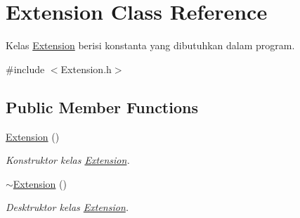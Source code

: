 \hypertarget{class_extension}{}\section{Extension Class Reference}
\label{class_extension}


Kelas \hyperlink{class_extension}{Extension} berisi konstanta yang dibutuhkan dalam program.  




{\ttfamily \#include $<$Extension.\+h$>$}

\subsection*{Public Member Functions}
\begin{DoxyCompactItemize}
\item 
\hypertarget{class_extension_add927117e09bb09a0d83e3cd3439a15d}{}\hyperlink{class_extension_add927117e09bb09a0d83e3cd3439a15d}{Extension} ()\label{class_extension_add927117e09bb09a0d83e3cd3439a15d}

\begin{DoxyCompactList}\small\item\em Konstruktor kelas \hyperlink{class_extension}{Extension}. \end{DoxyCompactList}\item 
\hypertarget{class_extension_a52c2b4e48fa3f78511b72d55fefcb48c}{}\hyperlink{class_extension_a52c2b4e48fa3f78511b72d55fefcb48c}{$\sim$\+Extension} ()\label{class_extension_a52c2b4e48fa3f78511b72d55fefcb48c}

\begin{DoxyCompactList}\small\item\em Desktruktor kelas \hyperlink{class_extension}{Extension}. \end{DoxyCompactList}\end{DoxyCompactItemize}
